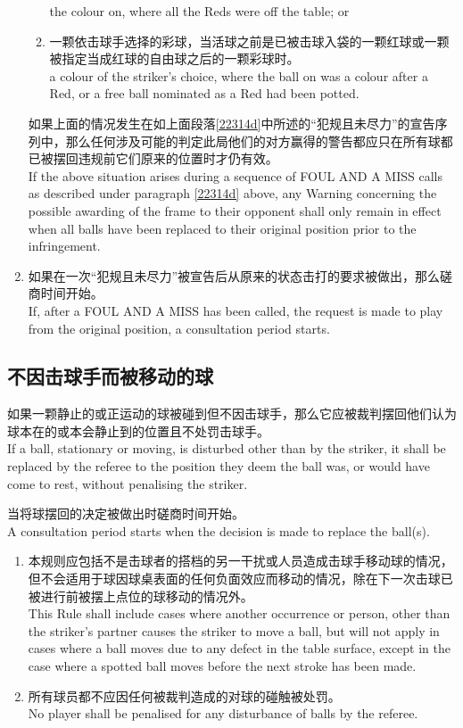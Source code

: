 \begin{enumerate}[label=(\alph*)]
\begin{enumerate}[label=(\roman*)]
        the colour on, where all the Reds were off the table; or
        \item 一颗依击球手选择的彩球，当活球之前是已被击球入袋的一颗红球或一颗被指定当成红球的自由球之后的一颗彩球时。\\
        a colour of the striker's choice, where the ball on was a colour after a Red, or a free ball nominated as a Red had been potted.
    \end{enumerate}
    如果上面的情况发生在如上面段落\ref{22314d}中所述的``犯规且未尽力''的宣告序列中，那么任何涉及可能的判定此局他们的对方赢得的警告都应只在所有球都已被摆回违规前它们原来的位置时才仍有效。\\
    If the above situation arises during a sequence of FOUL AND A MISS calls as described under paragraph \ref{22314d} above, any Warning concerning the possible awarding of the frame to their opponent shall only remain in effect when all balls have been replaced to their original position prior to the infringement.
    \item 如果在一次``犯规且未尽力''被宣告后从原来的状态击打的要求被做出，那么磋商时间开始。\\
    If, after a FOUL AND A MISS has been called, the request is made to play from the original position, a consultation period starts.
\end{enumerate}

\subsection{不因击球手而被移动的球}\label{22315}

\noindent 如果一颗静止的或正运动的球被碰到但不因击球手，那么它应被裁判摆回他们认为球本在的或本会静止到的位置且不处罚击球手。\\
If a ball, stationary or moving, is disturbed other than by the striker, it shall be replaced by the referee to the position they deem the ball was, or would have come to rest, without penalising the striker.

\noindent 当将球摆回的决定被做出时磋商时间开始。\\
A consultation period starts when the decision is made to replace the ball(s).
\begin{enumerate}[label=(\alph*)]
    \item 本规则应包括不是击球者的搭档的另一干扰或人员造成击球手移动球的情况，但不会适用于球因球桌表面的任何负面效应而移动的情况，除在下一次击球已被进行前被摆上点位的球移动的情况外。\\
    This Rule shall include cases where another occurrence or person, other than the striker's partner causes the striker to move a ball, but will not apply in cases where a ball moves due to any defect in the table surface, except in the case where a spotted ball moves before the next stroke has been made.
    \item 所有球员都不应因任何被裁判造成的对球的碰触被处罚。\\
    No player shall be penalised for any disturbance of balls by the referee.
\end{enumerate}

